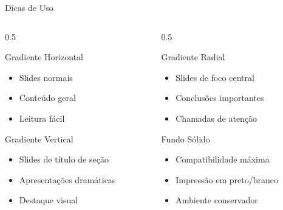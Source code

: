 \documentclass[aspectratio=169]{beamer}
\begin{document}
\fundogradiente

\begin{frame}{Dicas de Uso}
    \begin{columns}
        \begin{column}{0.5\textwidth}
            \begin{block}{Gradiente Horizontal}
                \begin{itemize}
                    \item Slides normais
                    \item Conteúdo geral
                    \item Leitura fácil
                \end{itemize}
            \end{block}
            
            \begin{block}{Gradiente Vertical}
                \begin{itemize}
                    \item Slides de título de seção
                    \item Apresentações dramáticas
                    \item Destaque visual
                \end{itemize}
            \end{block}
        \end{column}
        \begin{column}{0.5\textwidth}
            \begin{exampleblock}{Gradiente Radial}
                \begin{itemize}
                    \item Slides de foco central
                    \item Conclusões importantes
                    \item Chamadas de atenção
                \end{itemize}
            \end{exampleblock}
            
            \begin{alertblock}{Fundo Sólido}
                \begin{itemize}
                    \item Compatibilidade máxima
                    \item Impressão em preto/branco
                    \item Ambiente conservador
                \end{itemize}
            \end{alertblock}
        \end{column}
    \end{columns}
\end{frame}
\end{document}

